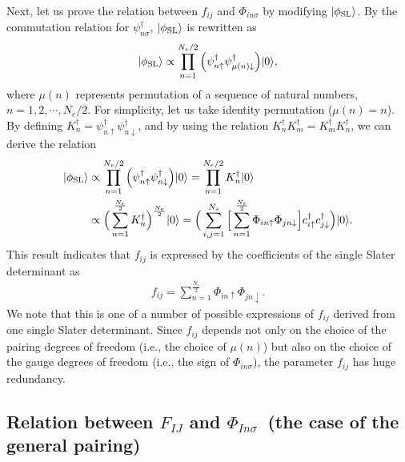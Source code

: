 Next, let us prove the relation between $f_{ij}$ and $\Phi_{in\sigma}$ by modifying $|\phi_{\rm SL}\rangle $.
By the commutation relation for $\psi^{\dagger}_{n\sigma}$, $|\phi_{\rm SL}\rangle$ is rewritten as 
\begin{align}
|\phi_{\rm SL}\rangle \propto \prod_{n=1}^{N_{e}/2}\Big(\psi_{n\uparrow}^{\dagger}\psi_{\mu(n)\downarrow}^{\dagger}\Big)|0\rangle,
\end{align}
where $\mu(n)$ represents permutation of a sequence of natural numbers, $n= 1, 2, \cdots, N_{e}/2$.
For simplicity, let us take identity permutation ($\mu(n) = n$).
By defining $K_{n}^{\dagger}=\psi_{n\uparrow}^{\dagger}\psi_{n\downarrow}^{\dagger}$, and by
using the relation $K_{n}^{\dagger}K_{m}^{\dagger}=K_{m}^{\dagger}K_{n}^{\dagger}$,
we can derive the relation
\begin{align}
|\phi_{\rm SL}\rangle &\propto \prod_{n=1}^{N_{e}/2}\Big(\psi_{n\uparrow}^{\dagger}\psi_{n\downarrow}^{\dagger}\Big)|0\rangle
=\prod_{n=1}^{N_{e}/2} K_{n}^{\dagger}|0\rangle \\
&\propto\Big(\sum_{n=1}^{\frac{N_{e}}{2}}K_{n}^{\dagger}\Big)^{\frac{N_{e}}{2}} |0\rangle
=\Big(\sum_{i,j=1}^{N_{s}}\Big[\sum_{n=1}^{\frac{N_{e}}{2}}\Phi_{in\uparrow}\Phi_{jn\downarrow}\Big]
c_{i\uparrow}^{\dagger}c_{j\downarrow}^{\dagger}\Big)|0\rangle.
\end{align}
This result indicates that $f_{ij}$ is expressed by the coefficients of the single Slater determinant as
\begin{align}
f_{ij}=\sum_{n=1}^{\frac{N_{e}}{2}}\Phi_{in\uparrow}\Phi_{jn\downarrow}.
\end{align}
We note that this is one of a number of possible expressions of $f_{ij}$ derived from one single Slater determinant.
Since $f_{ij}$ depends not only on the choice of the pairing degrees of freedom (i.e., the choice of $\mu(n)$) but also on
the choice of the gauge degrees of freedom (i.e., the sign of $\Phi_{in\sigma}$),
the parameter $f_{ij}$ has huge redundancy.

\subsection{Relation between $F_{IJ}$ and $\Phi_{In\sigma}$~(the case of the general pairing)}
\label{sec:PfaffianP}

